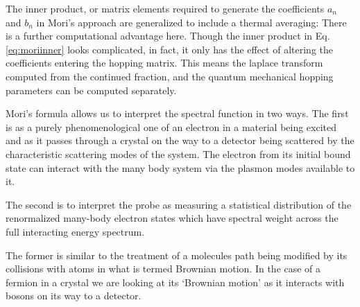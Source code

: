 The inner product, or matrix elements required to generate the coefficients 
$a_{n}$ and $b_{n}$ in Mori's approach are generalized to include a thermal averaging:
There is a further computational advantage here. Though the inner product in Eq.\ref{eq:moriinner}
looks complicated, in fact, it only has the effect of altering the coefficients entering
the hopping matrix. This means the laplace transform computed from the continued fraction,
and the quantum mechanical hopping parameters can be computed separately.

Mori's formula allows us to interpret the spectral function in two ways. The first is as
a purely phenomenological one of an electron in a material being excited and as it passes through
a crystal on the way to a detector being scattered by the characteristic scattering modes of the
system. The electron from its initial bound state can interact with the many body system via
the plasmon modes available to it.

The second is to interpret the probe as measuring a statistical distribution of the 
renormalized many-body electron states which have spectral weight across the full
interacting energy spectrum. 

The former is similar to the treatment of a molecules path
being modified by its collisions with atoms in what is termed Brownian motion. In the
case of a fermion in a crystal we are looking at its `Brownian motion' as it interacts
with bosons on its way to a detector. 

